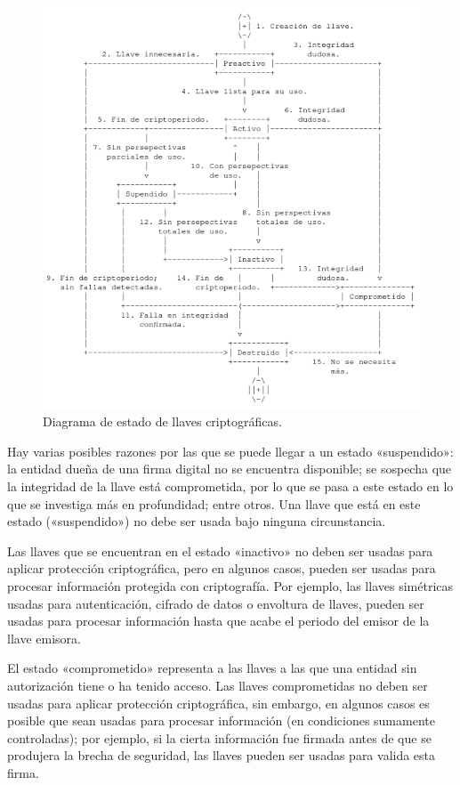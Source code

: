 \begin{figure}
  \begin{center}
    \includegraphics[width=0.8\linewidth]{diagramas/estados_de_llaves_ascii.png}
    \caption{Diagrama de estado de llaves criptográficas.}
    \label{estados_de_llaves}
  \end{center}
\end{figure}

Hay varias posibles razones por las que se puede llegar a un estado
«suspendido»: la entidad dueña de una firma digital no se encuentra disponible;
se sospecha que la integridad de la llave está comprometida, por lo que se pasa
a este estado en lo que se investiga más en profundidad; entre otros. Una
llave que está en este estado («suspendido») no debe ser usada bajo ninguna
circunstancia.

Las llaves que se encuentran en el estado «inactivo» no deben ser usadas para
aplicar protección criptográfica, pero en algunos casos, pueden ser usadas
para procesar información protegida con criptografía. Por ejemplo, las llaves
simétricas usadas para autenticación, cifrado de datos o envoltura de llaves,
pueden ser usadas para procesar información hasta que acabe el periodo del
emisor de la llave emisora.

El estado «comprometido» representa a las llaves a las que una entidad sin
autorización tiene o ha tenido acceso. Las llaves comprometidas no deben ser
usadas para aplicar protección criptográfica, sin embargo, en algunos casos
es posible que sean usadas para procesar información (en condiciones
sumamente controladas); por ejemplo, si la cierta información fue firmada
antes de que se produjera la brecha de seguridad, las llaves pueden ser
usadas para valida esta firma.
